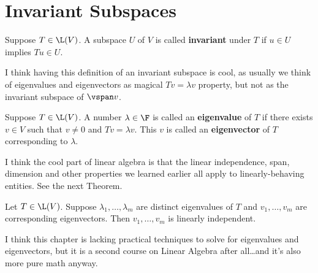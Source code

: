 \section{Invariant Subspaces}

\begin{definition}
  Suppose $T \in \L(V)$. A subspace $U$ of $V$ is called \textbf{invariant} under $T$ if $u \in U$ implies $Tu \in U$.
\end{definition}

I think having this definition of an invariant subspace is cool, as usually we think of eigenvalues and eigenvectors as magical $Tv = \lambda v$ property, but not as the invariant subspace of $\vspan v$.

\begin{definition}
  Suppose $T \in \L(V)$. A number $\lambda \in \F$ is called an \textbf{eigenvalue} of $T$ if there exists $v \in V$ such that $v \neq 0$ and $Tv = \lambda v$.
  This $v$ is called an \textbf{eigenvector} of $T$ corresponding to $\lambda$.
\end{definition}

I think the cool part of linear algebra is that the linear independence, span, dimension and other properties we learned earlier all apply to linearly-behaving entities.
See the next Theorem.

\begin{theorem}
  Let $T \in \L(V)$. Suppose $\lambda_1, \dots, \lambda_m$ are distinct eigenvalues of $T$ and $v_1, \dots, v_m$ are corresponding eigenvectors. Then $v_1, \dots, v_m$ is linearly independent.
\end{theorem}

I think this chapter is lacking practical techniques to solve for eigenvalues and eigenvectors, but it is a second course on Linear Algebra after all\dots and it's also more pure math anyway.



